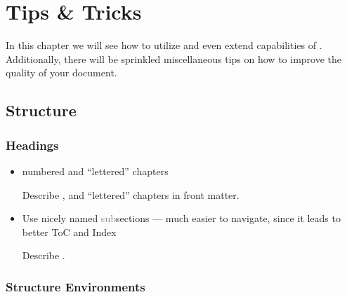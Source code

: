 \chapter{Tips \& Tricks} \label{ch:Tips}

In this chapter we will see how to utilize and even extend capabilities of \TeXsis{}.
Additionally, there will be sprinkled miscellaneous tips on how to improve the quality of your document.

\section{Structure}%
\label{sec:Structure}

\subsection{Headings}%
\label{sub:Headings}

\begin{itemize}
    \item numbered and \enquote{lettered} chapters
          \begin{Todo}
              Describe \custommacro{\chapternotnumbered}, and \enquote{lettered} chapters in front matter.
          \end{Todo}
    \item Use nicely named \textcolor{gray}{sub}sections --- much easier to navigate, since it leads to better ToC and Index
          \begin{Todo}
              Describe \macro{\texorpdfstring}.
          \end{Todo}
\end{itemize}

\subsection{Structure Environments}%
\label{sub:Structure Environments tips}

